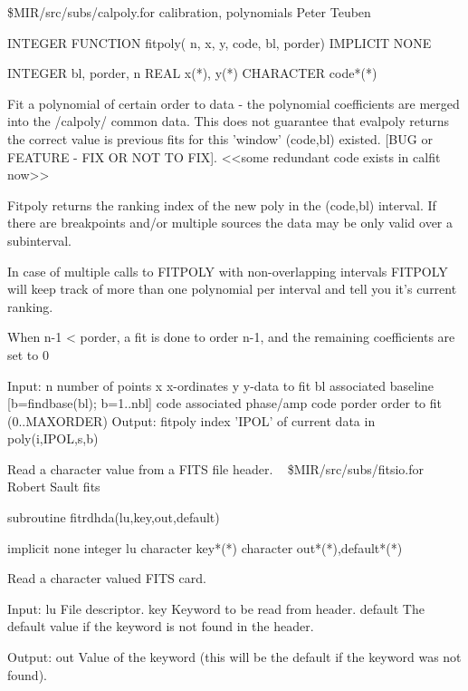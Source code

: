 \newline {} \$MIR/src/subs/calpoly.for
\newline {} calibration, polynomials
\newline {} Peter Teuben
\par{\tenpoint
{\eightpoint\begintt
        INTEGER FUNCTION fitpoly( n, x, y, code, bl, porder)
        IMPLICIT NONE

        INTEGER   bl, porder, n
        REAL      x(*), y(*)
        CHARACTER code*(*)

   Fit a polynomial of certain order to data - the polynomial coefficients
   are merged into the /calpoly/ common data. This does not guarantee
   that evalpoly returns the correct value is previous fits for this
   'window' (code,bl) existed. [BUG or FEATURE - FIX OR NOT TO FIX].
   <<some redundant code exists in calfit now>>

   Fitpoly returns the ranking index of the new poly in the (code,bl) 
   interval. If there are breakpoints and/or multiple sources the data 
   may be only valid over a subinterval. 

   In case of multiple calls to FITPOLY with
   non-overlapping intervals FITPOLY will keep track of more than
   one polynomial per interval and tell you it's current ranking.

   When n-1 < porder, a fit is done to order n-1, and the remaining
   coefficients are set to 0

   Input:
       n         number of points
       x         x-ordinates
       y         y-data to fit
       bl        associated baseline [b=findbase(bl); b=1..nbl]
       code      associated phase/amp code
       porder    order to fit (0..MAXORDER)
   Output:
       fitpoly   index 'IPOL' of current data in poly(i,IPOL,s,b)
\endtt}
\par}
%
\noindent Read a character value from a FITS file header.
\newline \ 
\newline {} \$MIR/src/subs/fitsio.for
\newline {} Robert Sault
\newline {} fits
\par{\tenpoint
{\eightpoint\begintt
        subroutine fitrdhda(lu,key,out,default)

        implicit none
        integer lu
        character key*(*)
        character out*(*),default*(*)

  Read a character valued FITS card.

  Input:
    lu         File descriptor.
    key        Keyword to be read from header.
    default    The default value if the keyword is not found in the header.

  Output:
    out        Value of the keyword (this will be the default if the
               keyword was not found).
\endtt}
\par}
